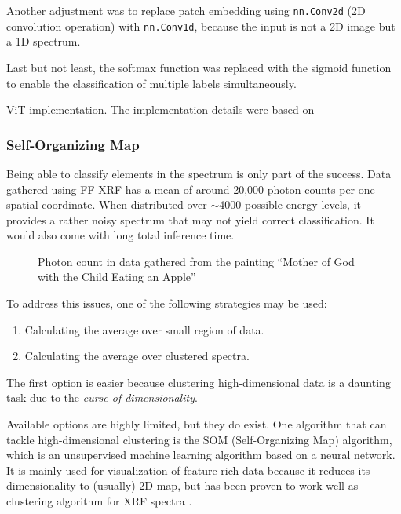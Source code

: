 Another adjustment was to replace patch embedding using \texttt{nn.Conv2d} (2D convolution operation) with \texttt{nn.Conv1d}, because the input is not a 2D image but a 1D spectrum. 

Last but not least, the softmax function was replaced with the sigmoid function to enable the classification of multiple labels simultaneously.

\newenvironment{longlistingC}{\captionsetup{type=listing, width=0.8\textwidth}}{}
\begin{longlistingC}
    \caption{ViT implementation. The implementation details were based on \cite{d2lViT}}
    \label{lst:vit}
\end{longlistingC}
\vspace{12pt}

\subsubsection{Self-Organizing Map}
Being able to classify elements in the spectrum is only part of the success. 
Data gathered using FF-XRF has a mean of around 20,000 photon counts per one spatial coordinate. 
When distributed over $\sim$4000 possible energy levels, it provides a rather noisy spectrum that may not yield correct classification. 
It would also come with long total inference time. 

\begin{figure}[H] 
  \centering     
   
  \caption{Photon count in data gathered from the painting ``Mother of God with the Child Eating an Apple''}
  \label{fig:matka-boska-photon-count}
\end{figure}

To address this issues, one of the following strategies may be used:
\begin{enumerate}
  \item Calculating the average over small region of data.
  \item Calculating the average over clustered spectra.
\end{enumerate}

The first option is easier because clustering high-dimensional data is a daunting task due to the \emph{curse of dimensionality}.

Available options are highly limited, but they do exist. 
One algorithm that can tackle high-dimensional clustering is the SOM (Self-Organizing Map) algorithm, which is an unsupervised machine learning algorithm based on a neural network. 
It is mainly used for visualization of feature-rich data because it reduces its dimensionality to (usually) 2D map, but has been proven to work well as clustering algorithm for XRF spectra \cite{Kogou2020}.

